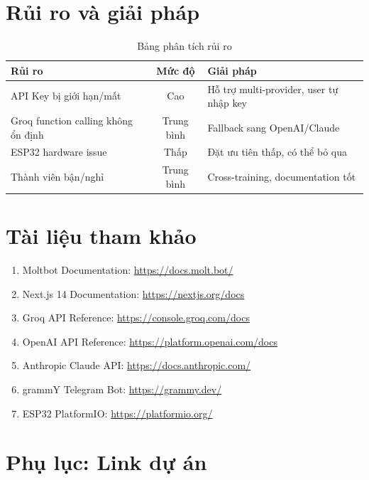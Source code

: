\documentclass[12pt,a4paper]{article}
\begin{document}
\section{Rủi ro và giải pháp}

\begin{table}[H]
    \centering
    \begin{tabular}{|p{4cm}|c|p{5cm}|}
        \hline
        \textbf{Rủi ro} & \textbf{Mức độ} & \textbf{Giải pháp} \\
        \hline
        API Key bị giới hạn/mất & Cao & Hỗ trợ multi-provider, user tự nhập key \\
        \hline
        Groq function calling không ổn định & Trung bình & Fallback sang OpenAI/Claude \\
        \hline
        ESP32 hardware issue & Thấp & Đặt ưu tiên thấp, có thể bỏ qua \\
        \hline
        Thành viên bận/nghỉ & Trung bình & Cross-training, documentation tốt \\
        \hline
    \end{tabular}
    \caption{Bảng phân tích rủi ro}
\end{table}

\section{Tài liệu tham khảo}

\begin{enumerate}
    \item Moltbot Documentation: \url{https://docs.molt.bot/}
    \item Next.js 14 Documentation: \url{https://nextjs.org/docs}
    \item Groq API Reference: \url{https://console.groq.com/docs}
    \item OpenAI API Reference: \url{https://platform.openai.com/docs}
    \item Anthropic Claude API: \url{https://docs.anthropic.com/}
    \item grammY Telegram Bot: \url{https://grammy.dev/}
    \item ESP32 PlatformIO: \url{https://platformio.org/}
\end{enumerate}

\section*{Phụ lục: Link dự án}
\end{document}
